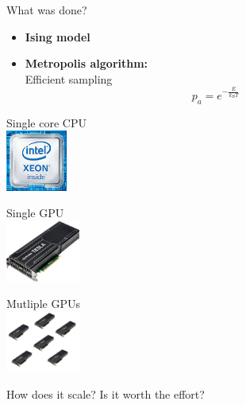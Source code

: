 \documentclass{beamer}
\begin{document}
\begin{frame}{What was done?}
    \begin{itemize}
        \item \textbf{Ising model}
            \noindent \ising
        \item \textbf{Metropolis algorithm:}\\
            Efficient sampling
            \begin{equation*}
                p_a = e^{-\frac{E}{k_B T}}
            \end{equation*}
    \end{itemize} \pause
    \vspace{5mm}
    \begin{minipage}{0.2\paperwidth}
        Single core CPU\\
        \includegraphics[keepaspectratio=true, height=2cm]{images/intel_xeon.jpg}
    \end{minipage} \pause
    \hfill
    \begin{minipage}{0.2\paperwidth}
        Single GPU\\
        \includegraphics[keepaspectratio=true, height=2cm]{images/gpu_modified.png}
    \end{minipage} \pause
    \hfill
    \begin{minipage}{0.3\paperwidth}
        Mutliple GPUs\\
        \includegraphics[keepaspectratio=true, height=2cm]{images/multi_gpu.png}
    \end{minipage} \pause
\begin{exampleblock}{}
    How does it scale? Is it worth the effort?
\end{exampleblock}
\end{frame}
\end{document}
